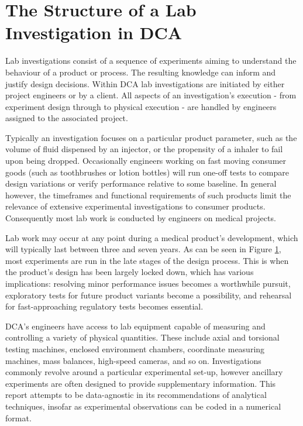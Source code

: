 \documentclass[11pt,a4paper,article]{memoir} %
\newlength\drop
\begin{document}
\section{The Structure of a Lab Investigation in DCA}
Lab investigations consist of a sequence of experiments aiming to understand the behaviour of a product or process. The resulting knowledge can inform and justify design decisions. Within DCA lab investigations are initiated by either project engineers or by a client. All aspects of an investigation's execution - from experiment design through to physical execution - are handled by engineers assigned to the associated project.
 \par
 Typically an investigation focuses on a particular product parameter, such as the volume of fluid dispensed by an injector, or the propensity of a inhaler to fail upon being dropped. Occasionally engineers working on fast moving consumer goods (such as toothbrushes or lotion bottles) will run one-off tests to compare design variations or verify performance relative to some baseline. In general however, the timeframes and functional requirements of such products limit the relevance of extensive experimental investigations to consumer products. Consequently most lab work is conducted by engineers on medical projects.
\par
Lab work may occur at any point during a medical product's development, which will typically last between three and seven years. As can be seen in Figure \ref{fig:time_of_tests}, most experiments are run in the late stages of the design process. This is when the product's design has been largely locked down, which has various implications: resolving minor performance issues becomes a worthwhile pursuit, exploratory tests for future product variants become a possibility, and rehearsal for fast-approaching regulatory tests becomes essential.
\begin{figure}
\label{fig:time_of_tests}
\end{figure}
\par
DCA's engineers have access to lab equipment capable of measuring and controlling a variety of physical quantities. These include axial and torsional testing machines, enclosed environment chambers, coordinate measuring machines, mass balances, high-speed cameras, and so on. Investigations commonly revolve around a particular experimental set-up, however ancillary experiments are often designed to provide supplementary information. This report attempts to be data-agnostic in its recommendations of analytical techniques, insofar as experimental observations can be coded in a numerical format.
\end{document}

